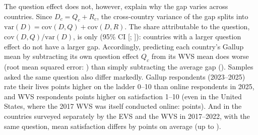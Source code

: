 \documentclass[11pt]{article}
\begin{document}
The question effect does not, however, explain why the gap varies across countries. Since $D_c = Q_c + R_c$, the cross-country variance of the gap splits into $\mathrm{var}(D) = \mathrm{cov}(D,Q) + \mathrm{cov}(D,R)$. The share attributable to the question, $\mathrm{cov}(D,Q)/\mathrm{var}(D)$, is only \decompVarShareQuestion (95\% CI [\decompLowVarShareQuestion; \decompHighVarShareQuestion]): countries with a larger question effect do not have a larger gap. Accordingly, predicting each country's Gallup mean by subtracting its own question effect $Q_c$ from its WVS mean does worse (root mean squared error: \decompRmsePredictionGallup) than simply subtracting the average gap (\decompRmseNaive). Samples asked the same question also differ markedly. Gallup respondents (2023--2025) rate their lives \meanSampleEffectGallup points higher on the ladder 0--10 than online respondents in 2025, and WVS respondents \meanSampleEffectWVS points higher on satisfaction 1--10 (even in the United States, where the 2017 WVS was itself conducted online: \sampleEffectUSWVS points). And in the \nEVSvsWVS countries surveyed separately by the EVS and the WVS in 2017--2022, with the same question, mean satisfaction differs by \meanAbsDiffEVSWVS points on average (up to \maxAbsDiffEVSWVS).
\end{document}
